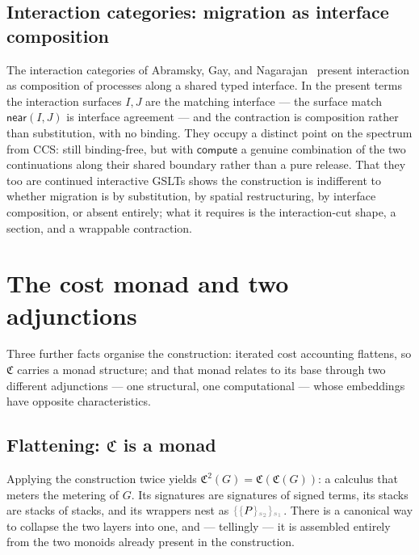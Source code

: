 \documentclass[11pt]{article}
\theoremstyle{definition}
\theoremstyle{plain}
\newcommand{\dec}[1]{\textcolor{costgray}{#1}}   %
\newcommand{\near}{\mathsf{near}}
\newcommand{\Cost}{\mathfrak{C}}              %
\newcommand{\sgn}[2]{\dec{\{}{#1}\dec{\}_{#2}}}  %
\newcommand{\compute}{\mathsf{compute}}
\begin{document}
\subsection{Interaction categories: migration as interface composition}

The interaction categories of Abramsky, Gay, and
Nagarajan~\cite{AbramskyGayNagarajan1996} present interaction as
composition of processes along a shared typed interface. In the present
terms the interaction surfaces $I, J$ are the matching interface --- the
surface match $\near(I,J)$ is interface agreement --- and the contraction
is composition rather than substitution, with no binding. They occupy a
distinct point on the spectrum from CCS: still binding-free, but with
$\compute$ a genuine combination of the two continuations along their
shared boundary rather than a pure release. That they too are continued
interactive GSLTs shows the construction is indifferent to whether
migration is by substitution, by spatial restructuring, by interface
composition, or absent entirely; what it requires is the interaction-cut
shape, a section, and a wrappable contraction.

\section{The cost monad and two adjunctions}
\label{sec:monad}

Three further facts organise the construction: iterated cost accounting
flattens, so $\Cost$ carries a monad structure; and that monad relates to
its base through two different adjunctions --- one structural, one
computational --- whose embeddings have opposite characteristics.

\subsection{Flattening: \texorpdfstring{$\Cost$}{Cost} is a monad}

Applying the construction twice yields $\Cost^2(G) = \Cost(\Cost(G))$: a
calculus that meters the metering of $G$. Its signatures are signatures
of signed terms, its stacks are stacks of stacks, and its wrappers nest as
$\sgn{\sgn{P}{s_2}}{s_1}$. There is a canonical way to collapse the two
layers into one, and --- tellingly --- it is assembled entirely from the
two monoids already present in the construction.
\end{document}
